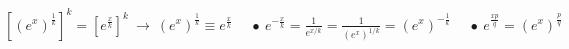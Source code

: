 \documentclass[12pt]{article}
\newcommand{\hs}{\hspace{1pt}} %
\newcommand{\mss}[1]{\text{\scriptsize\(#1\)}} %
\begin{document}
\vspace{10pt}
\(
	[ (e^{x})^{ \tfrac{1}{k} } ]^k = [ e^{ \tfrac{x}{k} } ]^k
	\ \rightarrow\ 
	\boxed{ (e^{x})^{ \tfrac{1}{k} } \equiv e^{ \tfrac{x}{k} } }
	\hspace{15pt}
	\bullet\ e^{ -\tfrac{x}{k} } = \tfrac{ 1 }{ e^{x/k} } = \tfrac{ 1 }{ (e^{x})^{1/k} } = (e^{x})^{ - \tfrac{1}{k} }
	\hspace{15pt}
	\bullet\ e^{ \tfrac{xp}{q} } = (e^{x})^{ \tfrac{p}{q} }
\)

\end{document}
